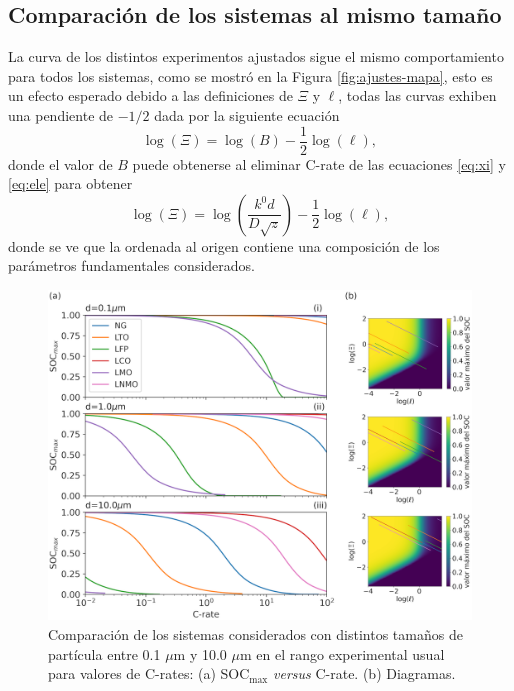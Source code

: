 \subsection{Comparación de los sistemas al mismo tamaño}

La curva de los distintos experimentos ajustados sigue el mismo comportamiento 
para todos los sistemas, como se mostró en la Figura \ref{fig:ajustes-mapa},
esto es un efecto esperado debido a las definiciones de $\Xi$ y $\ell$, todas las
curvas exhiben una pendiente de $-1/2$ dada por la siguiente ecuación
\begin{equation}
    \log(\Xi) = \log(B) - \frac{1}{2}\log(\ell),
\end{equation}
donde el valor de $B$ puede obtenerse al eliminar C-rate de las ecuaciones 
\ref{eq:xi} y \ref{eq:ele} para obtener
\begin{equation}
    \log(\Xi) = \log\left(\frac{k^0 d}{D \sqrt{z}}\right) - \frac{1}{2}\log(\ell),
\end{equation}
donde se ve que la ordenada al origen contiene una composición de los parámetros
fundamentales considerados. 

\begin{figure}[h!]
    \centering
    \includegraphics[width=\textwidth]{FastCharging/un/resultados/comparacion/comparacion.png}
    \caption{Comparación de los sistemas considerados con distintos tamaños de 
    partícula entre 0.1 $\mu$m y 10.0 $\mu$m en el rango experimental usual para 
    valores de C-rates: (a) SOC$_{\max}$ \textit{versus} C-rate. (b) Diagramas.}
    \label{fig:comparacion}
\end{figure}

